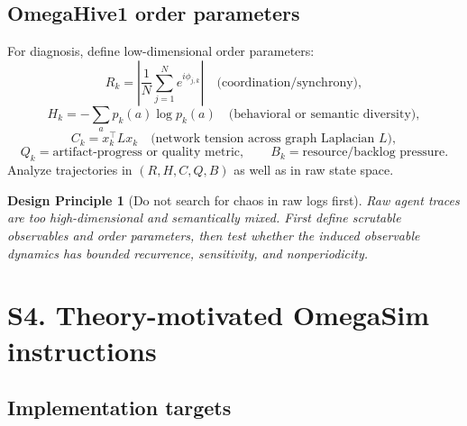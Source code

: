 \documentclass[11pt]{article}
\newtheorem{designprinciple}{Design Principle}
\begin{document}
\subsection{OmegaHive1 order parameters}

For diagnosis, define low-dimensional order parameters:
\[
  R_k=\left|\frac{1}{N}\sum_{j=1}^N e^{i\phi_{j,k}}\right|
  \quad\text{(coordination/synchrony)},
\]
\[
  H_k=-\sum_a p_k(a)\log p_k(a)
  \quad\text{(behavioral or semantic diversity)},
\]
\[
  C_k=x_k^\top L x_k
  \quad\text{(network tension across graph Laplacian $L$)},
\]
\[
  Q_k=\text{artifact-progress or quality metric},
  \qquad
  B_k=\text{resource/backlog pressure}.
\]
Analyze trajectories in $(R,H,C,Q,B)$ as well as in raw state space.

\begin{designprinciple}[Do not search for chaos in raw logs first]
Raw agent traces are too high-dimensional and semantically mixed.  First define
scrutable observables and order parameters, then test whether the induced
observable dynamics has bounded recurrence, sensitivity, and nonperiodicity.
\end{designprinciple}

\section{S4. Theory-motivated OmegaSim instructions}

\subsection{Implementation targets}
\end{document}
